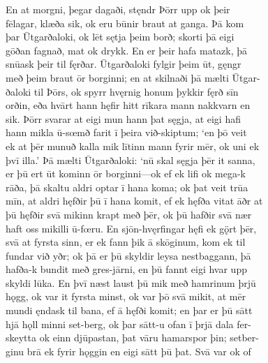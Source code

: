 \documentclass[12pt,letterpaper]{book}
\begin{document}
\begin{linenumbers}
En at morgni, þegar dagaði, stęndr Þōrr upp ok þeir\\
fēlagar, klæða sik, ok eru būnir braut at ganga.  Þā kom\\
þar Ūtgarðaloki, ok lēt sętja þeim borð; skorti þā eigi\\
gōðan fagnað, mat ok drykk.  En er þeir hafa matazk, þā\\
snūask þeir til fęrðar.  Ūtgarðaloki fylgir þeim ūt, gęngr\\
með þeim braut ōr borginni; en at skilnaði þā mælti Ūtgar-\\
ðaloki til Þōrs, ok spyrr hvęrnig honum þykkir fęrð sīn\\
orðin, eða hvārt hann hęfir hitt rīkara mann nakkvarn en\\
sik.  Þōrr svarar at eigi mun hann þat sęgja, at eigi hafi\\
hann mikla ū-sœmð farit ī þeira við-skiptum; `en þō veit\\
ek at þēr munuð kalla mik lītinn mann fyrir mēr, ok uni ek\\
þvī illa.'  Þā mælti Ūtgarðaloki: `nū skal sęgja þēr it sanna,\\
er þū ert ūt kominn ōr borginni---ok ef ek lifi ok mega-k\\
rāða, þā skaltu aldri optar ī hana koma; ok þat veit trūa\\
mīn, at aldri hęfðir þū ī hana komit, ef ek hęfða vitat āðr at\\
þū hęfðir svā mikinn krapt með þēr, ok þū hafðir svā nær\\
haft oss mikilli ū-fœru.  En sjōn-hvęrfingar hęfi ek gǫ̈rt þēr,\\
svā at fyrsta sinn, er ek fann þik ā skōginum, kom ek til\\
fundar við yðr; ok þā er þū skyldir leysa nestbaggann, þā\\
hafða-k bundit með gres-jārni, en þū fannt eigi hvar upp\\
skyldi lūka.  En þvī næst laust þū mik með hamrinum þrjū\\
hǫgg, ok var it fyrsta minst, ok var þō svā mikit, at mēr\\
mundi ęndask til bana, ef ā hęfði komit; en þar er þū sātt\\
hjā hǫll minni set-berg, ok þar sātt-u ofan ī þrjā dala fer-\\
skeytta ok einn djūpastan, þat vāru hamarspor þin; setber-\\
ginu brā ek fyrir hǫggin en eigi sātt þū þat.  Svā var ok of\\

\end{linenumbers}
\end{document}
